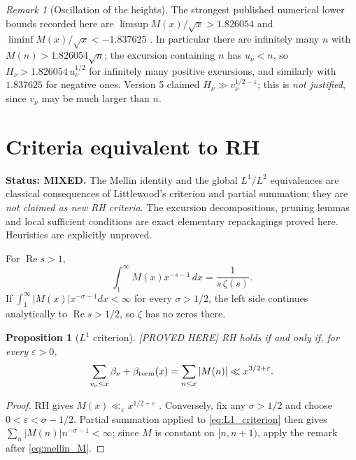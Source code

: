 \documentclass[11pt]{amsart}
\numberwithin{equation}{section}
\theoremstyle{plain}
\newtheorem{proposition}[theorem]{Proposition}
\theoremstyle{definition}
\theoremstyle{remark}
\newtheorem{remark}[theorem]{Remark}
\newcommand{\eps}{\varepsilon}
\begin{document}
\begin{remark}[Oscillation of the heights]
\label{rem:omega}
The strongest published numerical lower bounds recorded here are
$\limsup M(x)/\sqrt{x}>1.826054$ and
$\liminf M(x)/\sqrt{x}<-1.837625$ \cite{Hurst18}. In particular there are
infinitely many $n$ with $M(n)>1.826054\sqrt n$; the excursion containing $n$
has $u_\nu<n$, so $H_\nu>1.826054\,u_\nu^{1/2}$ for infinitely many
positive excursions, and similarly with $1.837625$ for negative ones. Version 5 claimed
$H_\nu\gg v_\nu^{1/2-\eps}$; this is \emph{not justified}, since $v_\nu$
may be much larger than $n$.
\end{remark}

\section{Criteria equivalent to RH}
\label{sec:criteria}

\noindent\textbf{Status: MIXED.} The Mellin identity and the global
$L^1/L^2$ equivalences are classical consequences of Littlewood's criterion
and partial summation; they are \emph{not claimed as new RH criteria}. The
excursion decompositions, pruning lemmas and local sufficient conditions are
exact elementary repackagings proved here. Heuristics are explicitly
unproved.

\medskip

For $\operatorname{Re}s>1$,
\begin{equation}
\label{eq:mellin_M}
  \int_1^\infty M(x)x^{-s-1}\,dx=\frac{1}{s\,\zeta(s)} .
\end{equation}
If $\int_1^\infty|M(x)|x^{-\sigma-1}dx<\infty$ for every $\sigma>1/2$, the
left side continues analytically to $\operatorname{Re}s>1/2$, so $\zeta$ has
no zeros there.

\begin{proposition}[$L^1$ criterion]
\label{prop:L1}
\emph{[PROVED HERE]} RH holds if and only if, for every $\eps>0$,
\begin{equation}
\label{eq:L1_criterion}
  \sum_{v_\nu\le x}\beta_\nu+\beta_{\rm term}(x)=\sum_{n\le x}|M(n)|
  \ll x^{3/2+\eps}.
\end{equation}
\end{proposition}

\begin{proof}
RH gives $M(x)\ll_\eps x^{1/2+\eps}$
\cite[\S14.25]{Titchmarsh1986}. Conversely, fix any $\sigma>1/2$ and choose
$0<\eps<\sigma-1/2$.  Partial summation applied to
\eqref{eq:L1_criterion} then gives
$\sum_n|M(n)|n^{-\sigma-1}<\infty$; since $M$ is constant on $[n,n+1)$,
apply the remark after \eqref{eq:mellin_M}.
\end{proof}
\end{document}
